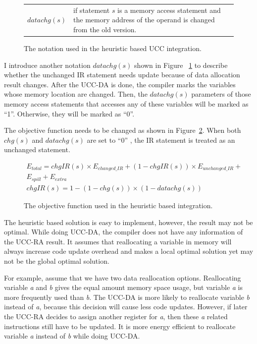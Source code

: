 \begin{figure}[htbp]
\begin{normalsize}
\begin{center}
\begin{tabular}{r|p{5in}} 
$datachg(s)$ & if statement $s$ is a memory access statement and the memory address of the operand is changed
from the old version.
\end{tabular}
\caption{ The notation used in the heuristic based UCC integration.}
\label{notation2}
\end{center}
\end{normalsize}
\end{figure}

I introduce another notation $datachg(s)$ shown in Figure ~\ref{notation2} to describe whether the unchanged IR
statement needs update because of data allocation result changes. After the UCC-DA is done, the compiler marks the variables whose memory location are changed. Then, the $datachg(s)$ parameters of those memory access statements that accesses any of these variables will be marked as ``1''. Otherwise, they will be marked as ``0''.


The objective function needs to be changed as shown in Figure~\ref{newObj}. When both $chg(s)$ and $datachg(s)$ are set to ``0'' , the IR statement is treated as an unchanged statement.
\begin{figure}[ht]
\begin{small}
\begin{eqnarray}
E_{total} = 
chgIR(s) \times E_{changed\_IR} + (1-chgIR(s))\times E_{unchanged\_IR} + \\
E_{spill} + E_{extra} \\
chgIR(s) =1-(1-chg(s))\times(1-datachg(s))
\end{eqnarray}
\end{small}
\caption{The objective function used in the heuristic based integration.}
\label{newObj}
\end{figure}

The heuristic based solution is easy to implement, however, the result may not be optimal.
While doing UCC-DA, the compiler does not have any information of the UCC-RA result.
It assumes that reallocating a variable in memory will always increase 
code update overhead and makes a local optimal solution yet may not be the global
optimal solution.

For example, assume that we have two data reallocation options. Reallocating variable
{\it a} and {\it b} gives the equal amount memory space usage, but variable {\it a}
is more frequently used than {\it b}. The UCC-DA is more likely to reallocate variable
{\it b} instead of {\it a}, because this decision will cause less code updates.
However, if later the UCC-RA decides to assign another register for {\it a}, then these {\it a} related instructions still 
have to be updated. It is more energy efficient to reallocate variable {\it a} instead
of {\it b} while doing UCC-DA.


